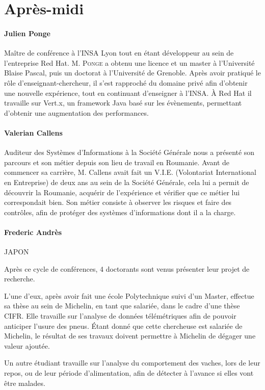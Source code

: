 \documentclass[14pt, a4paper]{report}
\begin{document}
\section{Après-midi}

\paragraph{Julien Ponge} Maître de conférence à l'INSA Lyon tout en étant développeur au sein de l'entreprise Red Hat. M. \textsc{Ponge} a obtenu une licence et un master à l'Université Blaise Pascal, puis un doctorat à l'Université de Grenoble. Après avoir pratiqué le rôle d'enseignant-chercheur, il s'est rapproché du domaine privé afin d'obtenir une nouvelle expérience, tout en continuant d'enseigner à l'INSA. À Red Hat il travaille sur Vert.x, un framework Java basé sur les évènements, permettant d'obtenir une augmentation des performances.

\paragraph{Valerian Callens} Auditeur des Systèmes d'Informations à la Société Générale nous a présenté son parcours et son métier depuis son lieu de travail en Roumanie. Avant de commencer sa carrière, M. Callens avait fait un V.I.E. (Volontariat International en Entreprise) de deux ans au sein de la Société Générale, cela lui a permit de découvrir la Roumanie, acquérir de l'expérience et vérifier que ce métier lui correspondait bien. Son métier consiste à observer les risques et faire des contrôles, afin de protéger des systèmes d'informations dont il a la charge.

\paragraph{Frederic Andrès}  JAPON



Après ce cycle de conférences, 4 doctorants sont venus présenter leur projet de recherche.


L'une d'eux, après avoir fait une école Polytechnique suivi d'un Master, effectue sa thèse au sein de Michelin, en tant que salariée, dans le cadre d'une thèse CIFR. Elle travaille sur l'analyse de données télémétriques afin de pouvoir anticiper l'usure des pneus. Étant donné que cette chercheuse est salariée de Michelin, le résultat de ses travaux doivent permettre à Michelin de dégager une valeur ajoutée.


Un autre étudiant travaille sur l'analyse du comportement des vaches, lors de leur repos, ou de leur période d'alimentation, afin de détecter à l'avance si elles vont être malades.
\end{document}
